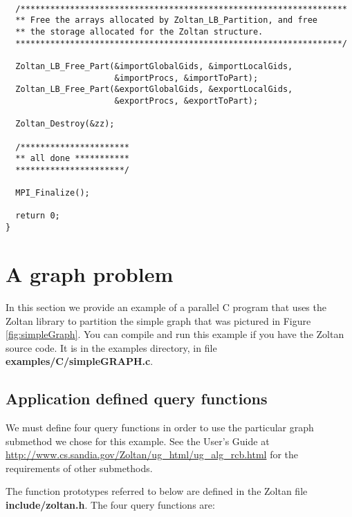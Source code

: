 \clearpage
\begin{flushleft}
\begin{verbatim}

  /******************************************************************
  ** Free the arrays allocated by Zoltan_LB_Partition, and free
  ** the storage allocated for the Zoltan structure.
  ******************************************************************/

  Zoltan_LB_Free_Part(&importGlobalGids, &importLocalGids, 
                      &importProcs, &importToPart);
  Zoltan_LB_Free_Part(&exportGlobalGids, &exportLocalGids, 
                      &exportProcs, &exportToPart);

  Zoltan_Destroy(&zz);

  /**********************
  ** all done ***********
  **********************/

  MPI_Finalize();

  return 0;
}

\end{verbatim}
\end{flushleft}

\clearpage
\section{A graph problem}

In this section we provide an example of a parallel C program
that uses the Zoltan library to partition the simple graph that
was pictured in Figure \ref{fig:simpleGraph}.  You can compile
and run this example if you have the Zoltan source code.  It is
in the examples directory, in file \textbf{examples/C/simpleGRAPH.c}.

\subsection{Application defined query functions}

We must define four query functions in order to use the
particular graph submethod we chose for this example.  See the
User's Guide at
\url{http://www.cs.sandia.gov/Zoltan/ug_html/ug_alg_rcb.html} for
the requirements of other submethods.

The function prototypes referred to below
are defined in the Zoltan file \textbf{include/zoltan.h}.
The four query functions are:

